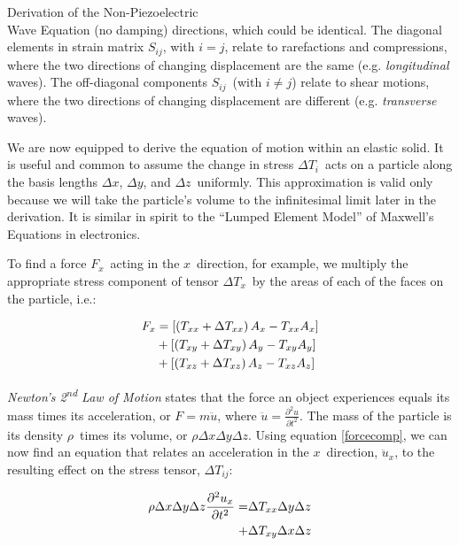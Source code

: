 \documentclass[a4paper,10pt]{report}
\numberwithin{equation}{section}
\begin{document}
{\begin{chapter}
\begin{section}{Derivation of the Non-Piezoelectric \\Wave Equation (no damping)}
directions, which could be identical. The diagonal elements in strain matrix $S_{ij}$, with $i=j$, relate to rarefactions and compressions, where the two directions of changing displacement are the same 
(e.g. \emph{longitudinal} waves). The off-diagonal components $S_{ij}$\  (with  $i
\neq j$) relate to shear motions, where the two directions of changing
displacement are different (e.g. \emph{transverse} waves). \cite[14]{Ballantine1997}
\par
We are now equipped to derive the equation of motion within an elastic solid.
It is useful and common to assume the change in stress $ \Delta T_i$\  acts on a
particle along the basis lengths $ \Delta x$, $ \Delta y$, 
and $ \Delta z$\  uniformly. This approximation is valid only because we will take the particle's volume to the infinitesimal limit later in the derivation. It is similar in spirit to the ``Lumped Element Model'' of Maxwell's Equations in electronics.
\par
To find a force $F_x$\  acting in the $x$\  direction, for example, we multiply the appropriate stress component of tensor $\Delta T_x$\  by the areas of each of the faces on the particle, i.e.\cite[p.~15]{Ballantine1997}:
\begin{singlespace}
\begin{align}
F_x &= \left[ \left( T_{xx} + \Delta T_{xx} \right) A_x - T_{xx} A_x \right]
\notag \\
&+ \left[ \left( T_{xy} + \Delta T_{xy} \right) A_y - T_{xy} A_y \right]  \\
&+ \left[ \left( T_{xz} + \Delta T_{xz} \right) A_z - T_{xz} A_z \right] \notag
\end{align}
\end{singlespace}
\emph{Newton's 2\textsuperscript{nd} Law of Motion} states that the force an object experiences equals its
mass times its acceleration, or $F = m \ddot{u}$, where $\ddot{u}
= \frac{\partial^2u}{\partial t^2}$. The mass of the particle is its density
$\rho$\  times its volume, or $\rho \Delta x \Delta y \Delta z$. 
Using equation \eqref{forcecomp}, we can now find an equation that relates an
acceleration in the $x$\  direction, $\ddot{u}_x$, to the 
resulting effect on the stress tensor, $\Delta T_{ij}$\cite[p.~16]{Ballantine1997}:
\begin{singlespace}
\begin{align}
\rho \Delta x \Delta y \Delta z \frac{\partial^2u_x}{\partial t^2} = &\Delta
T_{xx} \Delta y \Delta z \notag \\
+ &\Delta T_{xy} \Delta x \Delta z  \\

\end{align}
\end{singlespace}
\end{section}
\end{chapter}}
\end{document}
